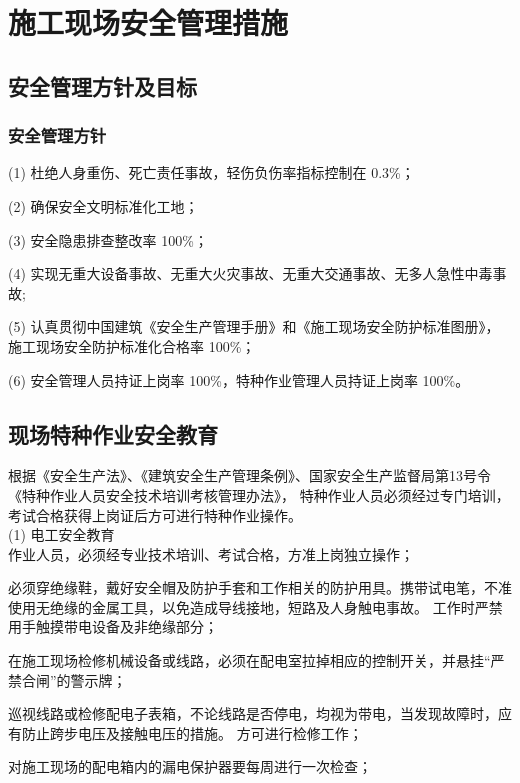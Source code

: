 \section{施工现场安全管理措施}
\subsection{安全管理方针及目标}
\subsubsection{安全管理方针}

(1) 杜绝人身重伤、死亡责任事故，轻伤负伤率指标控制在 0.3\%；

(2) 确保安全文明标准化工地；

(3) 安全隐患排查整改率 100\%；

(4) 实现无重大设备事故、无重大火灾事故、无重大交通事故、无多人急性中毒事故;

(5) 认真贯彻中国建筑《安全生产管理手册》和《施工现场安全防护标准图册》，施工现场安全防护标准化合格率 100\%；

(6) 安全管理人员持证上岗率 100\%，特种作业管理人员持证上岗率 100\%。

\subsection{现场特种作业安全教育}

根据《安全生产法》、《建筑安全生产管理条例》、国家安全生产监督局第13号令《特种作业人员安全技术培训考核管理办法》，
特种作业人员必须经过专门培训，考试合格获得上岗证后方可进行特种作业操作。\\

(1) 电工安全教育\\

 作业人员，必须经专业技术培训、考试合格，方准上岗独立操作；

 必须穿绝缘鞋，戴好安全帽及防护手套和工作相关的防护用具。携带试电笔，不准使用无绝缘的金属工具，以免造成导线接地，短路及人身触电事故。
工作时严禁用手触摸带电设备及非绝缘部分；

 在施工现场检修机械设备或线路，必须在配电室拉掉相应的控制开关，并悬挂“严禁合闸”的警示牌；

 巡视线路或检修配电子表箱，不论线路是否停电，均视为带电，当发现故障时，应有防止跨步电压及接触电压的措施。
方可进行检修工作；

 对施工现场的配电箱内的漏电保护器要每周进行一次检查；\\


